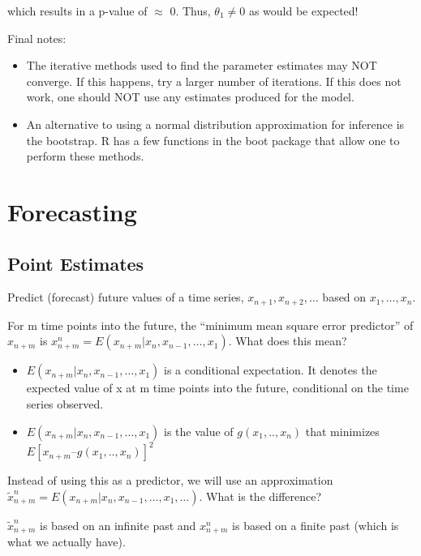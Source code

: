 \documentclass[
]{book}
\providecommand{\tightlist}{%
  \setlength{\itemsep}{0pt}\setlength{\parskip}{0pt}}
\theoremstyle{definition}
\theoremstyle{definition}
\theoremstyle{definition}
\theoremstyle{definition}
\theoremstyle{remark}
\begin{document}
which results in a p-value of \(\approx\) 0. Thus, \(\theta_1 \ne 0\) as would be expected!

Final notes:

\begin{itemize}
\tightlist
\item
  The iterative methods used to find the parameter estimates may NOT converge. If this happens, try a larger number of iterations. If this does not work, one should NOT use any estimates produced for the model.\\
\item
  An alternative to using a normal distribution approximation for inference is the bootstrap. R has a few functions in the boot package that allow one to perform these methods.
\end{itemize}

\hypertarget{forecasting}{%
\chapter{Forecasting}\label{forecasting}}

\hypertarget{point-estimates}{%
\section{Point Estimates}\label{point-estimates}}

Predict (forecast) future values of a time series, \(x_{n+1}, x_{n+2}, …\) based on \(x_1, …, x_n\).

For m time points into the future, the ``minimum mean square error predictor'' of \(x_{n+m}\) is \(x^n_{n+m} = E(x_{n+m}|x_n,x_{n-1},…, x_1)\). What does this mean?

\begin{itemize}
\item
  \(E(x_{n+m}|x_n,x_{n-1},…, x_1)\) is a conditional expectation. It denotes the expected value of x at m time points into the future, conditional on the time series observed.
\item
  \(E(x_{n+m}|x_n,x_{n-1},…, x_1)\) is the value of \(g(x_1,..,x_n)\) that minimizes \(E[x_{n+m} – g(x_1,..,x_n)]^2\)
\end{itemize}

Instead of using this as a predictor, we will use an approximation \(\tilde x^n_{n+m} = E(x_{n+m}|x_n,x_{n-1},…,x_1,…)\). What is the difference?

\(\tilde x^n_{n+m}\) is based on an infinite past and \(x_{n+m}^n\) is based on a finite past (which is what we actually have).
\end{document}
